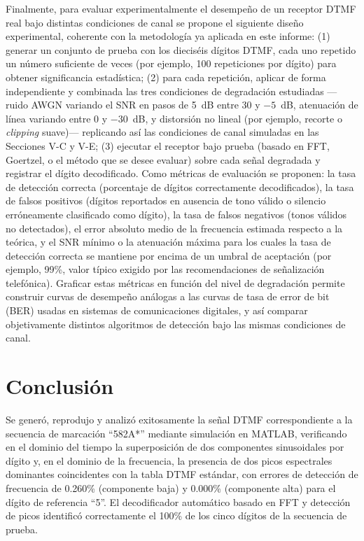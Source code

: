 \documentclass[conference]{IEEEtran}
\begin{document}
Finalmente, para evaluar experimentalmente el desempeño de un receptor DTMF real bajo distintas condiciones de canal se propone el siguiente diseño experimental, coherente con la metodología ya aplicada en este informe: (1) generar un conjunto de prueba con los dieciséis dígitos DTMF, cada uno repetido un número suficiente de veces (por ejemplo, 100 repeticiones por dígito) para obtener significancia estadística; (2) para cada repetición, aplicar de forma independiente y combinada las tres condiciones de degradación estudiadas —ruido AWGN variando el SNR en pasos de 5~dB entre 30 y $-5$~dB, atenuación de línea variando entre 0 y $-30$~dB, y distorsión no lineal (por ejemplo, recorte o \textit{clipping} suave)— replicando así las condiciones de canal simuladas en las Secciones V-C y V-E; (3) ejecutar el receptor bajo prueba (basado en FFT, Goertzel, o el método que se desee evaluar) sobre cada señal degradada y registrar el dígito decodificado. Como métricas de evaluación se proponen: la tasa de detección correcta (porcentaje de dígitos correctamente decodificados), la tasa de falsos positivos (dígitos reportados en ausencia de tono válido o silencio erróneamente clasificado como dígito), la tasa de falsos negativos (tonos válidos no detectados), el error absoluto medio de la frecuencia estimada respecto a la teórica, y el SNR mínimo o la atenuación máxima para los cuales la tasa de detección correcta se mantiene por encima de un umbral de aceptación (por ejemplo, 99\%, valor típico exigido por las recomendaciones de señalización telefónica). Graficar estas métricas en función del nivel de degradación permite construir curvas de desempeño análogas a las curvas de tasa de error de bit (BER) usadas en sistemas de comunicaciones digitales, y así comparar objetivamente distintos algoritmos de detección bajo las mismas condiciones de canal.

\section{Conclusión}

Se generó, reprodujo y analizó exitosamente la señal DTMF correspondiente a la secuencia de marcación ``582A*'' mediante simulación en MATLAB, verificando en el dominio del tiempo la superposición de dos componentes sinusoidales por dígito y, en el dominio de la frecuencia, la presencia de dos picos espectrales dominantes coincidentes con la tabla DTMF estándar, con errores de detección de frecuencia de 0.260\% (componente baja) y 0.000\% (componente alta) para el dígito de referencia ``5''. El decodificador automático basado en FFT y detección de picos identificó correctamente el 100\% de los cinco dígitos de la secuencia de prueba.
\end{document}
